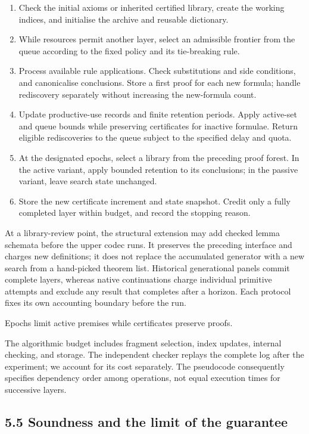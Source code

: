 \documentclass[pdflatex,sn-basic,Numbered]{sn-jnl}
\newcommand{\tightlist}{\setlength{\itemsep}{0pt}\setlength{\parskip}{0pt}}
\begin{document}
\begin{enumerate}
\def\labelenumi{\arabic{enumi}.}
\tightlist
\item
  Check the initial axioms or inherited certified library, create the working indices, and initialise the archive and reusable dictionary.
\item
  While resources permit another layer, select an admissible frontier from the queue according to the fixed policy and its tie-breaking rule.
\item
  Process available rule applications. Check substitutions and side conditions, and canonicalise conclusions. Store a first proof for each new formula; handle rediscovery separately without increasing the new-formula count.
\item
  Update productive-use records and finite retention periods. Apply active-set and queue bounds while preserving certificates for inactive formulae. Return eligible rediscoveries to the queue subject to the specified delay and quota.
\item
  At the designated epochs, select a library from the preceding proof forest. In the active variant, apply bounded retention to its conclusions; in the passive variant, leave search state unchanged.
\item
  Store the new certificate increment and state snapshot. Credit only a fully completed layer within budget, and record the stopping reason.
\end{enumerate}

At a library-review point, the structural extension may add checked lemma schemata before the upper codec runs. It preserves the preceding interface and charges new definitions; it does not replace the accumulated generator with a new search from a hand-picked theorem list. Historical generational panels commit complete layers, whereas native continuations charge individual primitive attempts and exclude any result that completes after a horizon. Each protocol fixes its own accounting boundary before the run.

Epochs limit active premises while certificates preserve proofs.

The algorithmic budget includes fragment selection, index updates, internal checking, and storage. The independent checker replays the complete log after the experiment; we account for its cost separately. The pseudocode consequently specifies dependency order among operations, not equal execution times for successive layers.

\subsection*{5.5 Soundness and the limit of the guarantee}\label{soundness-and-the-limit-of-the-guarantee}
\end{document}
